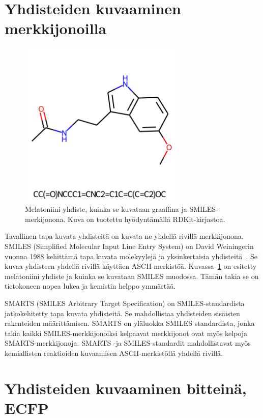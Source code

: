 \documentclass[finnish,twoside,censored,tkt,sw-line]{HYthesisML}
\begin{document}
\section{Yhdisteiden kuvaaminen merkkijonoilla}

\begin{figure}[!ht]
    \centering
    \includegraphics[width=8cm, height=8cm]{melatonin-smiles.png}
    \caption{Melatoniini yhdiste, kuinka se kuvataan graaffina ja SMILES-merkijonona.
        Kuva on tuotettu hyödyntämällä RDKit-kirjastoa.}
    \label{fig:melatonin}
\end{figure}

Tavallinen tapa kuvata yhdisteitä on kuvata ne yhdellä rivillä merkkijonona.
SMILES (Simplified Molecular Input Line Entry System) on David Weiningerin vuonna 1988 kehittämä tapa kuvata molekyylejä ja yksinkertaisia yhdisteitä~\cite{WeiningerSMILES}.
Se kuvaa yhdisteen yhdellä rivillä käyttäen ASCII-merkistöä.
Kuvassa~\ref{fig:melatonin} on esitetty melatoniini yhdiste ja kuinka se kuvataan SMILES muodossa.
Tämän takia se on tietokoneen nopea lukea ja kemistin helppo ymmärtää.

SMARTS (SMILES Arbitrary Target Specification) on SMILES-standardista jatkokehitetty tapa kuvata yhdisteitä.
Se mahdollistaa yhdisteiden sisäisten rakenteiden määrittämisen.
SMARTS on yläluokka SMILES standardista, jonka takia kaikki SMILES-merkkijonoiksi kelpaavat merkkijonot ovat myös kelpoja SMARTS-merkkijonoja.
SMARTS -ja SMILES-standardit mahdollistavat myös kemiallisten reaktioiden kuvaamisen ASCII-merkistöllä yhdellä rivillä.

\section{Yhdisteiden kuvaaminen bitteinä, ECFP}
\end{document}
